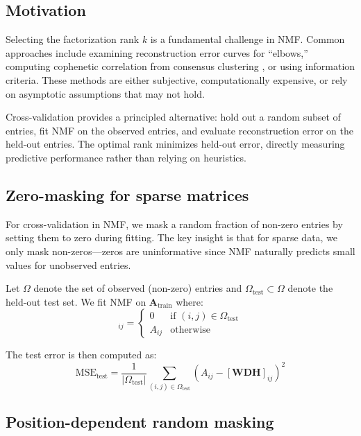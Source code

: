 \documentclass[article]{jss_modified}
\begin{document}
\subsection{Motivation}

Selecting the factorization rank $k$ is a fundamental challenge in NMF. Common 
approaches include examining reconstruction error curves for ``elbows,'' 
computing cophenetic correlation from consensus clustering \citep{Brunet2004}, 
or using information criteria. These methods are either subjective, 
computationally expensive, or rely on asymptotic assumptions that may not hold.

Cross-validation provides a principled alternative: hold out a random subset of 
entries, fit NMF on the observed entries, and evaluate reconstruction error on 
the held-out entries. The optimal rank minimizes held-out error, directly 
measuring predictive performance rather than relying on heuristics.

\subsection{Zero-masking for sparse matrices}

For cross-validation in NMF, we mask a random fraction of non-zero entries by 
setting them to zero during fitting. The key insight is that for sparse data, 
we only mask non-zeros---zeros are uninformative since NMF naturally predicts 
small values for unobserved entries.

Let $\Omega$ denote the set of observed (non-zero) entries and 
$\Omega_{\text{test}} \subset \Omega$ denote the held-out test set. We fit NMF 
on $\mathbf{A}_{\text{train}}$ where:
\begin{equation}
  [\mathbf{A}_{\text{train}}]_{ij} = \begin{cases}
    0 & \text{if } (i,j) \in \Omega_{\text{test}} \\
    A_{ij} & \text{otherwise}
  \end{cases}
  \label{eq:masking}
\end{equation}

The test error is then computed as:
\begin{equation}
  \text{MSE}_{\text{test}} = \frac{1}{|\Omega_{\text{test}}|} 
  \sum_{(i,j) \in \Omega_{\text{test}}} (A_{ij} - [\mathbf{W}\mathbf{D}
  \mathbf{H}]_{ij})^2
  \label{eq:test_mse}
\end{equation}

\subsection{Position-dependent random masking}
\end{document}
